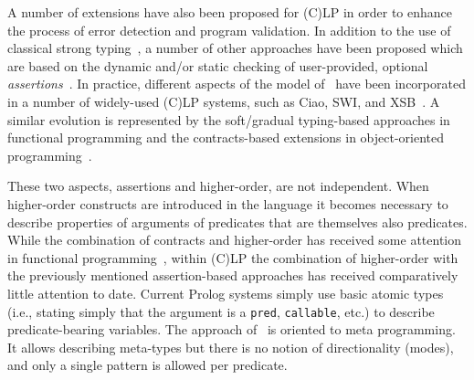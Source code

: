 \documentclass{llncs}
\begin{document}
A number of extensions have also been proposed for (C)LP in order
to enhance the process of error detection and program validation. In
addition to the use of classical strong
typing~\cite{goedel,mercury-jlp-short}, a number of other approaches
have been proposed which are based on the dynamic and/or static
checking of user-provided, optional \emph{assertions}~\cite{DNM88,assert-lang-ws,aadebug97-informal-short,BDM97,assrt-theoret-framework-lopstr99,DBLP:conf/discipl/Lai00,ciaopp-sas03-journal-scp-short,testchecks-iclp09}.
In practice, different aspects of the model
of~\cite{assrt-theoret-framework-lopstr99,ciaopp-sas03-journal-scp-short}
have been incorporated in a number of widely-used (C)LP systems, such
as Ciao, SWI, and XSB~\cite{hermenegildo11:ciao-design-tplp,xsb-journal-2012,DBLP:journals/tplp/MeraW13}.
A similar evolution is represented by the soft/gradual typing-based
approaches in functional programming and the contracts-based
extensions in object-oriented
programming~\cite{cartwright91:soft_typing-short,TypedSchemeF08-short,clousot,lamport99:types_spec_lang,DBLP:journals/fac/LeavensLM07}.

These two aspects, assertions and higher-order, are not independent.
When higher-order constructs are introduced in the language it becomes
necessary to describe properties of arguments of predicates that are
themselves also predicates.  While the combination of contracts and
higher-order has received some attention in functional
programming~\cite{DBLP:conf/icfp/FindlerF02,DBLP:journals/toplas/DimoulasF11},
within (C)LP the combination of higher-order with the previously
mentioned assertion-based approaches has received comparatively little
attention to date. Current Prolog systems simply use basic atomic
types (i.e., stating simply that the argument is a \texttt{pred},
\texttt{callable}, etc.) to describe predicate-bearing variables.
The approach of~\cite{BeierleKloosMeyer99} is oriented to meta
programming. It allows describing meta-types but there is no notion of
directionality (modes), and only a single pattern is allowed per
predicate.
\end{document}
